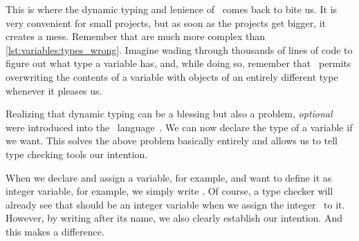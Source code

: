 This is where the dynamic typing and lenience of \python\ comes back to bite us.
It is very convenient for small projects, but as soon as the projects get bigger, it creates a mess.
Remember that  are much more complex than \cref{lst:variables:types_wrong}.
Imagine wading through thousands of lines of code to figure out what type a variable has, and, while doing so, remember that \python\ permits overwriting the contents of a variable with objects of an entirely different type whenever it pleases us.

Realizing that dynamic typing can be a blessing but also a problem, \emph{optional}  were introduced into the \python\ language~\cite{PEP484,R2023PTHATCPBNI}.
We can now declare the type of a variable if we want.
This solves the above problem basically entirely and allows us to tell type checking tools our intention.

When we declare and assign a variable,  for example, and want to define it as integer variable, for example, we simply write .
Of course, a type checker will already see that  should be an integer variable when we assign the integer~ to it.
However, by writing \pythonIdx{:} after its name, we also clearly establish our intention.
And this makes a difference.

%
%
%
%
%
%
%
%
%


